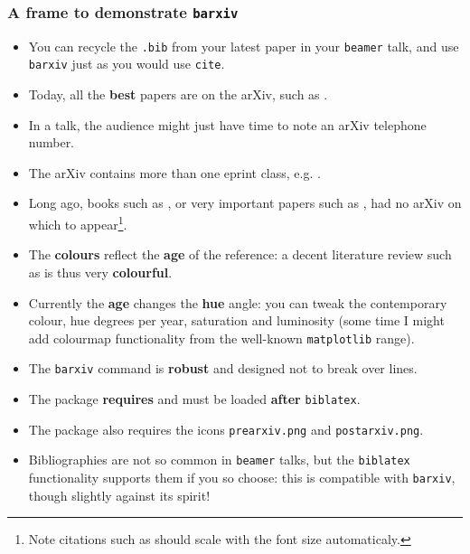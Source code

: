 \documentclass{beamer}
\begin{document}
\tiny
\begin{frame}
  \frametitle{A frame to demonstrate \texttt{barxiv}}
  \begin{itemize}
    \item You can recycle the \texttt{.bib} from your latest paper in your \texttt{beamer} talk, and use \texttt{barxiv} just as you would use \texttt{cite}.
    \item Today, all the \textbf{best} papers are on the arXiv, such as .
    \item In a talk, the audience might just have time to note an arXiv telephone number.
    \item The arXiv contains more than one eprint class, e.g. .
    \item Long ago, books such as , or very important papers such as , had no arXiv on which to appear\footnote{Note citations such as  should scale with the font size automaticaly.}.
    \item The \textbf{colours} reflect the \textbf{age} of the reference: a decent literature review such as  is thus very \textbf{colourful}.
    \item Currently the \textbf{age} changes the \textbf{hue} angle: you can tweak the contemporary colour, hue degrees per year, saturation and luminosity (some time I might add colourmap functionality from the well-known \texttt{matplotlib} range).
    \item The \texttt{barxiv} command is \textbf{robust} and designed not to break over lines.
    \item The package \textbf{requires} and must be loaded \textbf{after} \texttt{biblatex}. 
    \item The package also requires the icons \texttt{prearxiv.png} and \texttt{postarxiv.png}.
    \item Bibliographies are not so common in \texttt{beamer} talks, but the \texttt{biblatex} functionality supports them if you so choose: this is compatible with \texttt{barxiv}, though slightly against its spirit!
  \end{itemize}
\end{frame}
\end{document}
